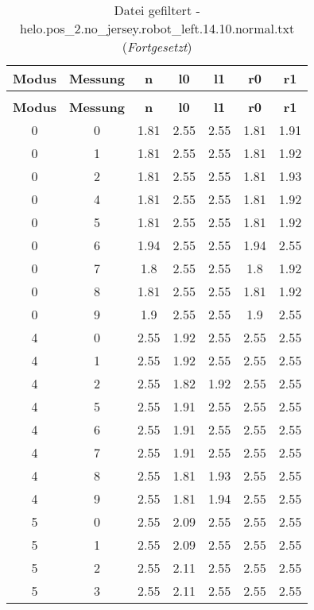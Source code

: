 \begin{longtable}{|c|c||c||c|c||c|c|}
	\caption{Datei gefiltert - helo.pos\_2.no\_jersey.robot\_left.14.10.normal.txt} \label{tab:helo.pos-2.no-jersey.robot-left.14.10.normal.txt} \\ \hline
	\textbf{Modus} & \textbf{Messung} & \textbf{n} & \textbf{l0} & \textbf{l1} & \textbf{r0} & \textbf{r1}\\ \hline
	\endfirsthead
	\caption[]{Datei gefiltert - helo.pos\_2.no\_jersey.robot\_left.14.10.normal.txt (\emph{Fortgesetzt})} \\ \hline
	\textbf{Modus} & \textbf{Messung} & \textbf{n} & \textbf{l0} & \textbf{l1} & \textbf{r0} & \textbf{r1}\\ \hline
	\endhead
	0 & 0 & 1.81 & 2.55 & 2.55 & 1.81 & 1.91 \\ \hline
	0 & 1 & 1.81 & 2.55 & 2.55 & 1.81 & 1.92 \\ \hline
	0 & 2 & 1.81 & 2.55 & 2.55 & 1.81 & 1.93 \\ \hline
	0 & 4 & 1.81 & 2.55 & 2.55 & 1.81 & 1.92 \\ \hline
	0 & 5 & 1.81 & 2.55 & 2.55 & 1.81 & 1.92 \\ \hline
	0 & 6 & 1.94 & 2.55 & 2.55 & 1.94 & 2.55 \\ \hline
	0 & 7 & 1.8 & 2.55 & 2.55 & 1.8 & 1.92 \\ \hline
	0 & 8 & 1.81 & 2.55 & 2.55 & 1.81 & 1.92 \\ \hline
	0 & 9 & 1.9 & 2.55 & 2.55 & 1.9 & 2.55 \\ \hline
	4 & 0 & 2.55 & 1.92 & 2.55 & 2.55 & 2.55 \\ \hline
	4 & 1 & 2.55 & 1.92 & 2.55 & 2.55 & 2.55 \\ \hline
	4 & 2 & 2.55 & 1.82 & 1.92 & 2.55 & 2.55 \\ \hline
	4 & 5 & 2.55 & 1.91 & 2.55 & 2.55 & 2.55 \\ \hline
	4 & 6 & 2.55 & 1.91 & 2.55 & 2.55 & 2.55 \\ \hline
	4 & 7 & 2.55 & 1.91 & 2.55 & 2.55 & 2.55 \\ \hline
	4 & 8 & 2.55 & 1.81 & 1.93 & 2.55 & 2.55 \\ \hline
	4 & 9 & 2.55 & 1.81 & 1.94 & 2.55 & 2.55 \\ \hline
	5 & 0 & 2.55 & 2.09 & 2.55 & 2.55 & 2.55 \\ \hline
	5 & 1 & 2.55 & 2.09 & 2.55 & 2.55 & 2.55 \\ \hline
	5 & 2 & 2.55 & 2.11 & 2.55 & 2.55 & 2.55 \\ \hline
	5 & 3 & 2.55 & 2.11 & 2.55 & 2.55 & 2.55 \\ \hline

\end{longtable}
